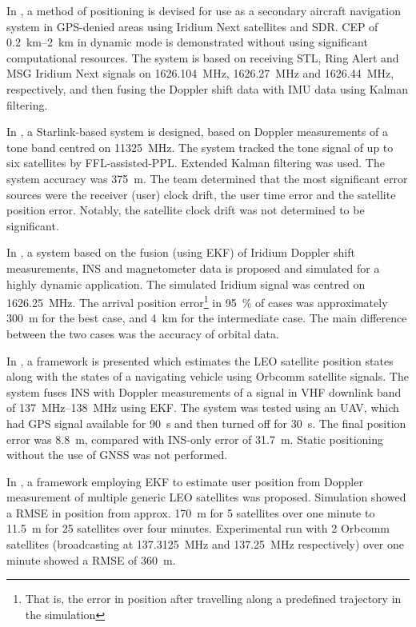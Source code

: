 In \cite{sop01}, a method of positioning is devised for use as a secondary aircraft navigation system in GPS-denied areas using Iridium Next satellites and SDR. CEP of \qtyrange{0.2}{2}{\km} in dynamic mode is demonstrated without using significant computational resources. The system is based on receiving STL, Ring Alert and MSG Iridium Next signals on \qty{1626.104}{\mega\hertz}, \qty{1626.27}{\mega\hertz} and \qty{1626.44}{\mega\hertz}, respectively, and then fusing the Doppler shift data with IMU data using Kalman filtering.

In \cite{sop04}, a Starlink-based system is designed, based on Doppler measurements of a tone band centred on \qty{11 325}{\mega\hertz}. The system tracked the tone signal of up to six satellites by FFL-assisted-PPL. Extended Kalman filtering was used. The system accuracy was \qty{375}{\metre}. The team determined that the most significant error sources were the receiver (user) clock drift, the user time error and the satellite position error. Notably, the satellite clock drift was not determined to be significant.

In \cite{sop05}, a system based on the fusion (using EKF) of Iridium Doppler shift measurements, INS and magnetometer data is proposed and simulated for a highly dynamic application. The simulated Iridium signal was centred on \qty{1626.25}{\mega\hertz}. The arrival position error\footnote{That is, the error in position after travelling along a predefined trajectory in the simulation} in \qty{95}{\percent} of cases was approximately \qty{300}{\metre} for the best case, and \qty{4}{\km} for the intermediate case. The main difference between the two cases was the accuracy of orbital data.

In \cite{sop08}, a framework is presented which estimates the LEO satellite position states along with the states of a navigating vehicle using Orbcomm satellite signals. The system fuses INS with Doppler measurements of a signal in VHF downlink band of \qtyrange{137}{138}{\mega\hertz} using EKF. The system was tested using an UAV, which had GPS signal available for \qty{90}{\s} and then turned off for \qty{30}{\s}. The final position error was \qty{8.8}{\m}, compared with INS-only error of \qty{31.7}{\m}. Static positioning without the use of GNSS was not performed.

In \cite{sop10}, a framework employing EKF to estimate user position from Doppler measurement of multiple generic LEO satellites was proposed. Simulation showed a RMSE in position from approx. \qty{170}{\m} for 5 satellites over one minute to \qty{11.5}{\m} for 25 satellites over four minutes. Experimental run with 2 Orbcomm satellites (broadcasting at \qty{137.3125}{\mega\hertz} and \qty{137.25}{\mega\hertz} respectively) over one minute showed a RMSE of \qty{360}{\m}.


